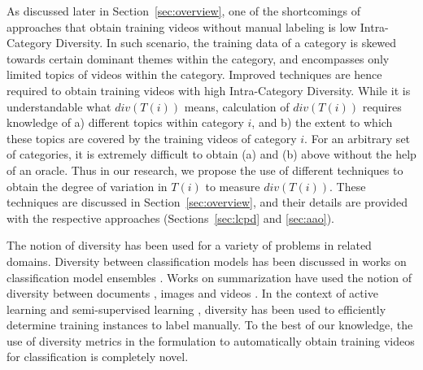 As discussed later in Section~\ref{sec:overview}, one of the shortcomings of approaches that obtain training videos without manual labeling is low Intra-Category Diversity. In such scenario, the training data of a category is skewed towards certain dominant themes within the category, and encompasses only limited topics of videos within the category. Improved techniques are hence required to obtain training videos with high Intra-Category Diversity. While it is understandable what $div(T(i))$ means, calculation of $div(T(i))$ requires knowledge of a) different topics within category $i$, and b) the extent to which these topics are covered by the training videos of category $i$. For an arbitrary set of categories, it is extremely difficult to obtain (a) and (b) above without the help of an oracle. Thus in our research, we propose the use of different techniques to obtain the degree of variation in $T(i)$ to measure $div(T(i))$. These techniques are discussed in Section~\ref{sec:overview}, and their details are provided with the respective approaches (Sections~\ref{sec:lcpd} and \ref{sec:aao}). 

The notion of diversity has been used for a variety of problems in related domains. Diversity between classification models has been discussed in works on classification model ensembles \cite{Ludmila03}. Works on summarization have used the notion of diversity between documents \cite{LiEnhanc09,ZhuNovSum13}, images \cite{KennedyGen08} and videos \cite{ShroffTMM10}. In the context of active learning \cite{WangActive11} and semi-supervised learning \cite{MisraWatch15}, diversity has been used to efficiently determine training instances to label manually. To the best of our knowledge, the use of diversity metrics in the formulation to automatically obtain training videos for classification is completely novel. 

